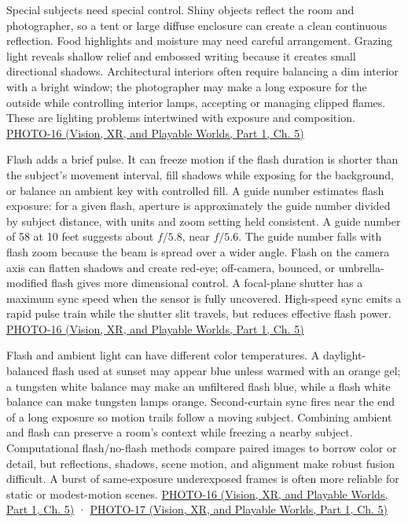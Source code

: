 Special subjects need special control. Shiny objects reflect the room and photographer, so a tent or large diffuse enclosure can create a clean continuous reflection. Food highlights and moisture may need careful arrangement. Grazing light reveals shallow relief and embossed writing because it creates small directional shadows. Architectural interiors often require balancing a dim interior with a bright window; the photographer may make a long exposure for the outside while controlling interior lamps, accepting or managing clipped flames. These are lighting problems intertwined with exposure and composition. \href{../07-Vision-XR-and-Playable-Worlds-P01/main.pdf\#nameddest=04-visual-computing-ii-ch036-photo-16---photography-session-16}{PHOTO-16 (Vision, XR, and Playable Worlds, Part 1, Ch. 5)}

Flash adds a brief pulse. It can freeze motion if the flash duration is shorter than the subject's movement interval, fill shadows while exposing for the background, or balance an ambient key with controlled fill. A guide number estimates flash exposure: for a given flash, aperture is approximately the guide number divided by subject distance, with units and zoom setting held consistent. A guide number of 58 at 10 feet suggests about \(f/5.8\), near \(f/5.6\). The guide number falls with flash zoom because the beam is spread over a wider angle. Flash on the camera axis can flatten shadows and create red-eye; off-camera, bounced, or umbrella-modified flash gives more dimensional control. A focal-plane shutter has a maximum sync speed when the sensor is fully uncovered. High-speed sync emits a rapid pulse train while the shutter slit travels, but reduces effective flash power. \href{../07-Vision-XR-and-Playable-Worlds-P01/main.pdf\#nameddest=04-visual-computing-ii-ch036-photo-16---photography-session-16}{PHOTO-16 (Vision, XR, and Playable Worlds, Part 1, Ch. 5)}

Flash and ambient light can have different color temperatures. A daylight-balanced flash used at sunset may appear blue unless warmed with an orange gel; a tungsten white balance may make an unfiltered flash blue, while a flash white balance can make tungsten lamps orange. Second-curtain sync fires near the end of a long exposure so motion trails follow a moving subject. Combining ambient and flash can preserve a room's context while freezing a nearby subject. Computational flash/no-flash methods compare paired images to borrow color or detail, but reflections, shadows, scene motion, and alignment make robust fusion difficult. A burst of same-exposure underexposed frames is often more reliable for static or modest-motion scenes. \href{../07-Vision-XR-and-Playable-Worlds-P01/main.pdf\#nameddest=04-visual-computing-ii-ch036-photo-16---photography-session-16}{PHOTO-16 (Vision, XR, and Playable Worlds, Part 1, Ch. 5)} · \href{../07-Vision-XR-and-Playable-Worlds-P01/main.pdf\#nameddest=04-visual-computing-ii-ch036-photo-17---photography-session-17}{PHOTO-17 (Vision, XR, and Playable Worlds, Part 1, Ch. 5)}

